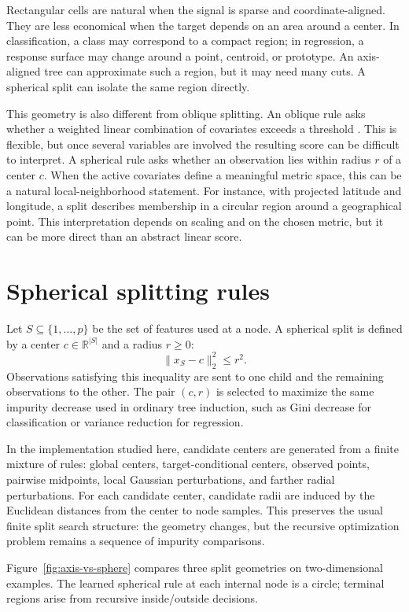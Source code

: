 \documentclass[final,5p,times,twocolumn]{elsarticle}
\begin{document}
Rectangular cells are natural when the signal is sparse and coordinate-aligned.
They are less economical when the target depends on an area around a center. In
classification, a class may correspond to a compact region; in regression, a
response surface may change around a point, centroid, or prototype. An
axis-aligned tree can approximate such a region, but it may need many cuts. A
spherical split can isolate the same region directly.

This geometry is also different from oblique splitting. An oblique rule asks
whether a weighted linear combination of covariates exceeds a threshold
\cite{murthy1994oc1}. This is flexible, but once several variables are involved
the resulting score can be difficult to interpret. A spherical rule asks
whether an observation lies within radius $r$ of a center $c$. When the active
covariates define a meaningful metric space, this can be a natural
local-neighborhood statement. For instance, with projected latitude and
longitude, a split describes membership in a circular region around a
geographical point. This interpretation depends on scaling and on the chosen
metric, but it can be more direct than an abstract linear score.

\section{Spherical splitting rules}

Let $S\subseteq\{1,\ldots,p\}$ be the set of features used at a node. A
spherical split is defined by a center $c\in\mathbb{R}^{|S|}$ and a radius
$r\ge 0$:
\[
    \|x_S-c\|_2^2 \le r^2.
\]
Observations satisfying this inequality are sent to one child and the remaining
observations to the other. The pair $(c,r)$ is selected to maximize the same
impurity decrease used in ordinary tree induction, such as Gini decrease for
classification or variance reduction for regression.

In the implementation studied here, candidate centers are generated from a
finite mixture of rules: global centers, target-conditional centers, observed
points, pairwise midpoints, local Gaussian perturbations, and farther radial
perturbations. For each candidate center, candidate radii are induced by the
Euclidean distances from the center to node samples. This preserves the usual
finite split search structure: the geometry changes, but the recursive
optimization problem remains a sequence of impurity comparisons.

Figure~\ref{fig:axis-vs-sphere} compares three split geometries on
two-dimensional examples. The learned spherical rule at each internal node is a
circle; terminal regions arise from recursive inside/outside decisions.
\end{document}
